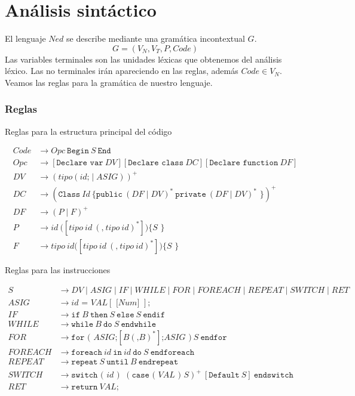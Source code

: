 \documentclass[10pt,a4paper]{article}
\newcommand{\cc}[1]{\texttt{#1}}
\newcommand{\ra}{\rightarrow}
\begin{document}
\section{Análisis sintáctico}
El lenguaje $Ned$ se describe mediante una gramática incontextual $G$. $$G=(V_N, V_T, P, Code)$$
Las variables terminales son las unidades léxicas que obtenemos del análisis léxico. Las no terminales irán apareciendo en las reglas, además $Code \in V_N$. Veamos las reglas para la gramática de nuestro lenguaje.

\subsubsection*{Reglas}

Reglas para la estructura principal del código

\begin{equation*}
\begin{split}
Code 	& \ra Opc \ \cc{Begin}\ S \ \cc{End} \\
Opc 	& \ra [ \cc{Declare var} \ DV ] [ \cc{Declare class} \ DC ] [\cc{Declare function} \ DF ] \\
DV 	& \ra ( tipo (id\cc{;} \mid ASIG))^+ \\
DC 	& \ra ( \cc{Class} \ Id \ \cc{\{ public} \ (DF \mid DV)^* \  \cc{private} \ (DF \mid DV)^* \cc{ \}})^+ \\
DF 	& \ra (P \mid F)^+ \\
P 	& \ra id \ \cc{(}[tipo \ id \ (\cc{,} \ tipo \ id )^*]\cc{)}\cc{\{ }S\cc{ \}} \\
F 	& \ra tipo \  id \cc{(}[tipo \ id \ (\cc{,} \ tipo \ id )^*]\cc{)}\cc{\{ }S\cc{ \}} 
\end{split}
\end{equation*}

Reglas para las instrucciones

\begin{equation*}
\begin{split}
S 		& \ra  DV \mid ASIG \mid IF \mid WHILE \mid FOR \mid FOREACH \mid REPEAT \mid SWITCH \mid RET \\
ASIG 		& \ra id \cc{ = } VAL[ \cc{ [}Num\cc{] }] \cc{;} \\
IF 		& \ra \cc{if} \ B \ \cc{then} \ S \ \cc{else} \ S \ \cc{endif} \\
WHILE	& \ra \cc{while} \ B \ \cc{do} \ S \ \cc{endwhile} \\
FOR 		& \ra \cc{for ( }ASIG\cc{;}[ B(\cc{,}B)^* ]\cc{;} ASIG \cc{ )}\ S\ \cc{endfor} \\
FOREACH  	& \ra \cc{foreach}\ id\ \cc{in} \ id\ \cc{do} \ S \ \cc{endforeach} \\
REPEAT 	& \ra \cc{repeat} \ S \ \cc{until} \ B \ \cc{endrepeat} \\
SWITCH 	& \ra \cc{switch ( } id \cc{ ) } \ (\cc{case ( } VAL \cc{ ) } S)^+\ [\cc{Default} \ S] \ \cc{endswitch} \\
RET 		& \ra \cc{return}  \ VAL\cc{;}
\end{split}
\end{equation*}
\end{document}
